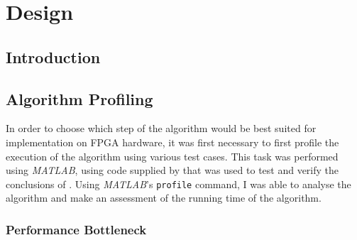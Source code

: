 \chapter{Design}
\label{ch:design}

\section{Introduction}
\label{sec:designIntroduction}

\section{Algorithm Profiling}
\label{sec:algorithmProfiling}
In order to choose which step of the algorithm would be best suited for 
implementation on FPGA hardware, it was first necessary to first profile the 
execution of the algorithm using various test cases. This task was performed 
using \emph{MATLAB}, using code supplied by \citeauthor{Khoa:2012} that was used
to test and verify the conclusions of . Using 
\emph{MATLAB}'s \verb+profile+ command, I was able to analyse the algorithm and 
make an assessment of the running time of the algorithm.

\subsection{Performance Bottleneck}
\label{sec:algorithmPerformanceBottleneck}

